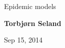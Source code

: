 \documentclass[%
twoside,                 %
final,                   %
10pt]{article}
\begin{document}






\thispagestyle{empty}

\begin{center}
{\LARGE\bf
\begin{spacing}{1.25}
Epidemic models
\end{spacing}
}
\end{center}


\begin{center}
{\bf Torbjørn Seland${}^{}$} \\ [0mm]
\end{center}

    \begin{center}
\end{center}


\begin{center}
Sep 15, 2014
\end{center}

\vspace{1cm}


\tableofcontents


\vspace{1cm} %
\end{document}
